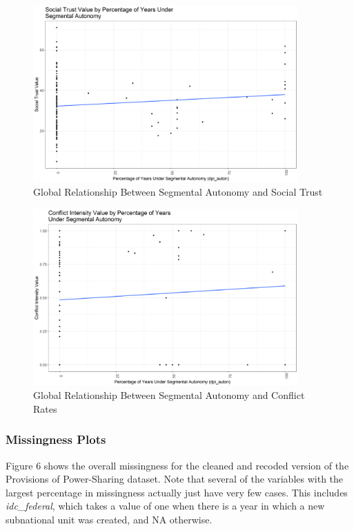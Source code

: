 \documentclass[12pt]{article}
\begin{document}
\begin{figure}[!htbp]
	\begin{center}
		\includegraphics[width = 4in]{csts_qog_hum_trust.png}
	\end{center}
	\caption{Global Relationship Between Segmental Autonomy and Social Trust}
\end{figure}

\begin{figure}[!htbp]
	\begin{center}
		\includegraphics[width = 4in]{csts_ucdp_cumulative_intensity.png}
	\end{center}
	\caption{Global Relationship Between Segmental Autonomy and Conflict Rates}
\end{figure}

\subsubsection{Missingness Plots}

Figure 6 shows the overall missingness for the cleaned and recoded version of the Provisions of Power-Sharing dataset. Note that several of the variables with the largest percentage in missingness actually just have very few cases. This includes \textit{idc\_federal}, which takes a value of one when there is a year in which a new subnational unit was created, and NA otherwise. 
\end{document}
